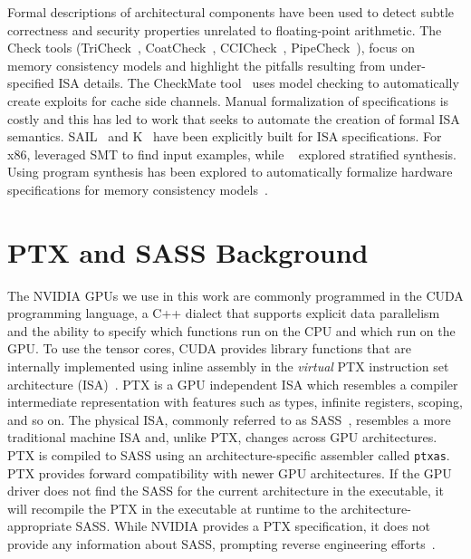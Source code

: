 Formal descriptions of architectural components have been used to detect subtle correctness and security properties unrelated to floating-point arithmetic.
The Check tools (TriCheck~\cite{trippel2017tricheck}, CoatCheck~\cite{lustig_coatcheck_2016}, 
CCICheck~\cite{manerkar_ccicheck_2015}, 
PipeCheck~\cite{lustig_pipecheck_2014}), focus on memory consistency models and highlight the pitfalls resulting from under-specified ISA details.
The CheckMate tool~\cite{trippel_checkmate_2018} uses model checking to automatically create exploits for cache side channels.
Manual formalization of specifications is costly and this has led to work that seeks to automate the creation of formal ISA semantics. SAIL~\cite{armstrong_isa_2019} and K~\cite{dasgupta_complete_2019} have been explicitly built for ISA specifications. For x86, \citet{godefroid-taly} leveraged SMT to find input examples, while ~\citet{heule_stratified_2016} explored stratified synthesis. Using program synthesis has been explored to automatically formalize hardware specifications for memory consistency models~\cite{hsiao2021synthesizing,norman2023pipesynth}.




\section{PTX and SASS Background}
\label{sec:ptx-sass}

The NVIDIA GPUs we use in this work are commonly programmed in the CUDA programming language, a C++ dialect that supports explicit data parallelism and the ability to specify which functions run on the CPU and which run on the GPU.
To use the tensor cores, CUDA provides library functions that are internally implemented using inline assembly in the \textit{virtual} PTX instruction set architecture (ISA)~\cite{nvidia-ptx}.
PTX is a GPU independent ISA which resembles a compiler intermediate representation with features such as types, infinite registers, scoping, and so on. 
The physical ISA, commonly referred to as SASS~\cite{BinaryUtilities}, resembles a more traditional machine ISA and, unlike PTX, changes across GPU architectures.
PTX is compiled to SASS using an architecture-specific assembler called \texttt{ptxas}.
PTX provides forward compatibility with newer GPU architectures. 
If the GPU driver does not find the SASS for the current architecture in the executable, it will recompile the PTX in the executable at runtime to the architecture-appropriate SASS.
While NVIDIA provides a PTX specification, it does not provide any information about SASS, prompting reverse engineering efforts~\cite{sun2022dissecting, yan2020demystifying, fang2022towards,hayes_decoding_2019}.

